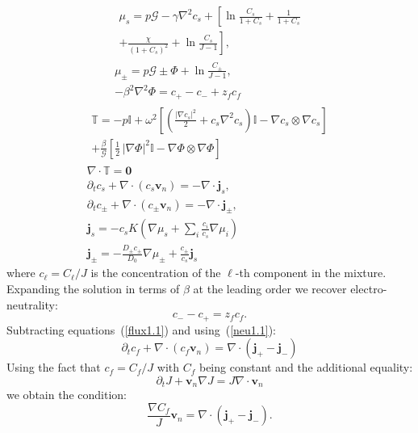 \documentclass[12pt]{extarticle}
\begin{document}
\begin{gather}
\begin{aligned}
\mu_s = p \mathcal{G} -\gamma\nabla^2c_s+ \left[\ln \frac{C_s}{1+C_s} + \frac{1}{1+C_s}\right.\\
\left.+\frac{\chi}{(1+C_s)^2} + \ln \frac{C_s}{J-1} \right], 
\end{aligned}\\[2.5mm]
\mu_\pm = p \mathcal{G} \pm \Phi + \ln \frac{C_\pm}{J-1} ,\\
-\beta^2 \nabla^2 \Phi = c_+-c_-+z_fc_f\, 
\end{gather}
\begin{gather}
\begin{aligned}
\mathbb{T}= -p \mathbb{I} +  \omega^2\left[\left(\frac{|\nabla c_s|^2}{2}+c_s\nabla^2c_s\right)\mathbb{I} - \nabla c_s \otimes \nabla c_s\right]\\
+ \frac{\beta}{\mathcal{G}} \left[\frac{1}{2} \,|\nabla \Phi|^2\mathbb{I} -\nabla \Phi \otimes \nabla \Phi\right]
\end{aligned}\\
\nabla \cdot \mathbb{T}=\mathbf{0}\\
\partial_t c_s + \nabla \cdot(c_s \mathbf{v}_n)=- \nabla \cdot\mathbf{j}_s,\\
\partial_t c_\pm + \nabla \cdot(c_\pm \mathbf{v}_n)= -\nabla\cdot\mathbf{j}_\pm,\label{flux1.1}\\
\mathbf{j}_s =-c_sK  \left(\nabla \mu_s +\sum_i \frac{c_i}{c_s} \nabla \mu_i\right)\\
\mathbf{j}_\pm= - \frac{D_\pm c_\pm}{D_0}\nabla \mu_\pm + \frac{c_\pm}{c_s}\mathbf{j}_s
\end{gather}
where $c_\ell=C_\ell/J$ is the concentration of the $\ell$-th component in the mixture.
Expanding the solution in terms of $\beta$ at the leading order we recover electro-neutrality:
\begin{equation}
c_- - c_+=z_f c_f. \label{neu1.1}
\end{equation}
Subtracting equations~(\ref{flux1.1}) and using~(\ref{neu1.1}):
\begin{equation}
\partial_t c_f +\nabla \cdot(c_f \mathbf{v}_n)= \nabla\cdot(\mathbf{j}_+-\mathbf{j}_-)
\end{equation}
Using the fact that $c_f=C_f/J$ with $C_f$ being constant and the additional equality:
\begin{equation}
\partial_t J + \mathbf{v}_n \nabla J=J\nabla \cdot\mathbf{v}_n
\end{equation}
we obtain the condition:
\begin{equation}
\frac{\nabla C_f}{J}\mathbf{v}_n= \nabla\cdot(\mathbf{j}_+-\mathbf{j}_-).
\end{equation}
\end{document}
